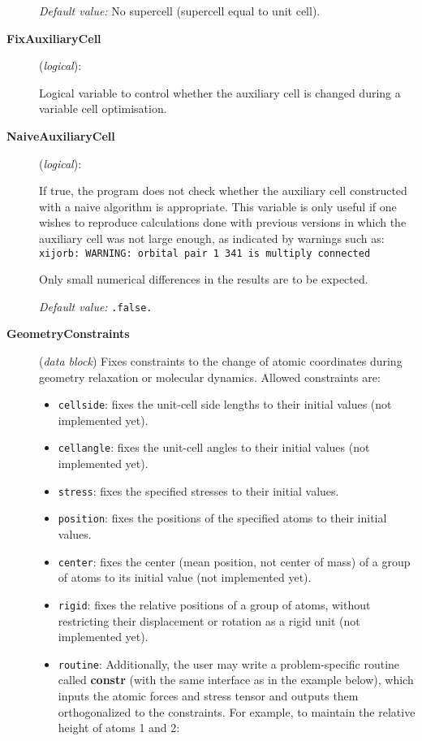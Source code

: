 \documentclass[11pt]{article}
\begin{document}
\begin{description}
{\it Default value:} No supercell (supercell equal to unit cell).

\item[{\bf FixAuxiliaryCell}] ({\it logical}): 

Logical variable to control whether the auxiliary cell is changed
during a variable cell optimisation.

\item[{\bf NaiveAuxiliaryCell}] ({\it logical}): 

If true, the program does not check whether the auxiliary cell
constructed with a naive algorithm is appropriate. This variable
is only useful if one wishes to reproduce calculations done with
previous versions in which the auxiliary cell was not large enough, 
as indicated by warnings such as:\\
\texttt{xijorb: WARNING: orbital pair 1  341 is multiply connected}

Only small numerical differences in the results are to be expected.

{\it Default value:} {\tt .false.}


\item[{\bf GeometryConstraints}] ({\it data block}) 
Fixes constraints to the change of atomic coordinates during
geometry relaxation or molecular dynamics. Allowed constraints are:
\begin{itemize}
\item {\tt cellside}: fixes the unit-cell side lengths to
their initial values (not implemented yet).
\item {\tt cellangle}: fixes the unit-cell angles to
their initial values (not implemented yet).
\item {\tt stress}: fixes the specified stresses to
their initial values.
\item {\tt position}: fixes the positions of the specified atoms to
their initial values.
\item {\tt center}: fixes the center (mean position, not center of
mass) of a group of atoms to its initial value (not implemented yet).
\item {\tt rigid}: fixes the relative positions of a group of atoms,
without restricting their displacement or rotation as a rigid unit
(not implemented yet).
\item {\tt routine}: Additionally, the user may write a 
problem-specific routine called {\bf constr} (with the same 
interface as in the example below), which inputs the atomic
forces and stress tensor and outputs them orthogonalized to the
constraints. For example, to maintain the relative height of 
atoms 1 and 2:


\end{itemize}
\end{description}
\end{document}
